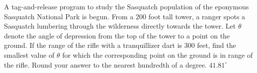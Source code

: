  {A tag-and-release program to study the Sasquatch population of the eponymous Sasquatch National Park is begun. From a 200 foot tall tower, a ranger spots a Sasquatch lumbering through the wilderness directly towards the tower. Let $\theta$ denote the angle of depression from the top of the tower to a point on the ground. If the range of the rifle with a tranquillizer dart is 300 feet, find the smallest value of $\theta$ for which the corresponding point on the ground is in range of the rifle. Round your answer to the nearest hundredth of a degree.}
{ $41.81^{\circ}$}
